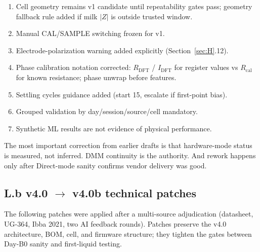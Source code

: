 \documentclass[11pt,a4paper]{article}
\begin{document}
\begin{enumerate}
\item Cell geometry remains v1 candidate until repeatability gates pass; geometry fallback rule added if milk $|Z|$ is outside trusted window.
\item Manual CAL/SAMPLE switching frozen for v1.
\item Electrode-polarization warning added explicitly (Section~\ref{sec:H}.12).
\item Phase calibration notation corrected: $R_{\mathrm{DFT}}$ / $I_{\mathrm{DFT}}$ for register values vs $R_{\mathrm{cal}}$ for known resistance; phase unwrap before features.
\item Settling cycles guidance added (start 15, escalate if first-point bias).
\item Grouped validation by day/session/source/cell mandatory.
\item Synthetic ML results are not evidence of physical performance.
\end{enumerate}

\begin{reviewerbox}
The most important correction from earlier drafts is that hardware-mode status is measured, not inferred. DMM continuity is the authority. And rework happens only after Direct-mode sanity confirms vendor delivery was good.
\end{reviewerbox}

\subsection*{L.b v4.0 $\rightarrow$ v4.0b technical patches}

The following patches were applied after a multi-source adjudication (datasheet, UG-364, Ibba 2021, two AI feedback rounds). Patches preserve the v4.0 architecture, BOM, cell, and firmware structure; they tighten the gates between Day-B0 sanity and first-liquid testing.
\end{document}
